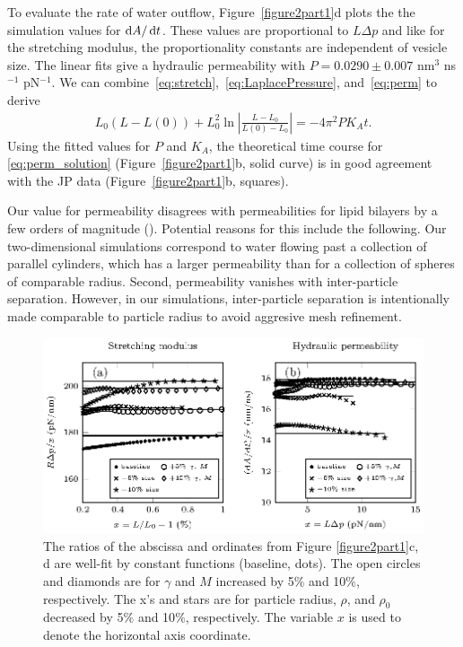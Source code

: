 \documentclass[lineno]{jfm}
\begin{document}
To evaluate the rate of water outflow, 
Figure~\ref{figure2part1}d plots the the simulation values for $\dif A/\dif t$.  
These values are proportional to $L\Delta p$ and like for the stretching modulus, 
the proportionality constants are 
independent of vesicle size.
The  linear fits give a hydraulic permeability with $P = 0.0290 \pm 0.007$ nm$^3$ ns$^{-1}$ pN$^{-1}$.
We can combine~\eqref{eq:stretch},~\eqref{eq:LaplacePressure},
and~\eqref{eq:perm} to derive
\begin{align}
\label{eq:perm_solution}
L_0(L-L(0)) + L_0^2 \ln\left|\frac{L-L_0}{L(0)-L_0}\right| = -4\pi^2 P K_A t.
\end{align}
Using the fitted values for $P$ and $K_A$, the theoretical time course for 
\eqref{eq:perm_solution} (Figure~\ref{figure2part1}b, solid curve) is in good
agreement with the JP data (Figure~\ref{figure2part1}b, squares).

Our value for permeability disagrees 
with permeabilities for lipid bilayers by a few orders of magnitude  (\cite{chabanon2017, qua-gan-you2021}).
Potential reasons for this include the following. 
Our two-dimensional simulations correspond to water flowing past a collection
of parallel cylinders, which has a larger permeability than for a collection
of spheres of comparable radius.   
Second, permeability vanishes with inter-particle separation.  
However, in our simulations, inter-particle separation is intentionally made comparable to 
particle radius to avoid aggresive mesh refinement.

\begin{figure}
\centering
\includegraphics[width=\textwidth]{fig8.eps}
\caption{\label{figure2}  
The ratios of the abscissa and ordinates from Figure \ref{figure2part1}c, d are well-fit by constant functions (baseline, dots).
The open circles and diamonds are for $\gamma$ and $M$ increased by 5$\%$ and 10$\%$, respectively. 
The x's and stars are for particle radius, $\rho$, and $\rho_0$ decreased by 5$\%$ and 10$\%$, respectively.
The variable $x$ is used to denote the horizontal axis coordinate. 
}
\end{figure}
\end{document}
